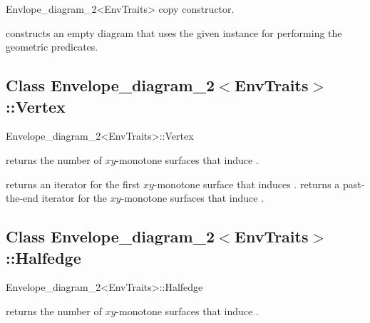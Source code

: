 \begin{ccRefClass}{Envlope_diagram_2<EnvTraits>}
    {copy constructor.}
        
    {constructs an empty diagram that uses the given 
     instance for performing the geometric predicates.}


\subsection*{Class Envelope\_diagram\_2$<$EnvTraits$>$::Vertex}

\begin{ccClass}{Envelope_diagram_2<EnvTraits>::Vertex}

\ccInheritsFrom

\ccAccessFunctions

{returns the number of $xy$-monotone surfaces that induce \ccVar.}

{returns an iterator for the first $xy$-monotone surface that induces \ccVar.}
\ccGlue
{}
{returns a past-the-end iterator for the $xy$-monotone surfaces that induce
 \ccVar.}

\end{ccClass}


\subsection*{Class Envelope\_diagram\_2$<$EnvTraits$>$::Halfedge}

\begin{ccClass}{Envelope_diagram_2<EnvTraits>::Halfedge}

\ccInheritsFrom

\ccAccessFunctions

{returns the number of $xy$-monotone surfaces that induce \ccVar.}


\end{ccClass}
\end{ccRefClass}
